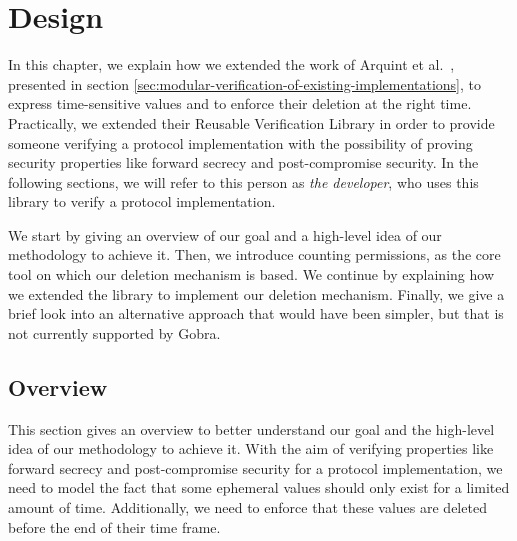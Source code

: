 
\chapter{Design}
\label{chap:design}

In this chapter, we explain how we extended the work of Arquint et al.\ \cite{}, presented in section \ref{sec:modular-verification-of-existing-implementations}, to express time-sensitive values and to enforce their deletion at the right time.
Practically, we extended their Reusable Verification Library in order to provide someone verifying a protocol implementation with the possibility of proving security properties like forward secrecy and post-compromise security.
In the following sections, we will refer to this person as \emph{the developer}, who uses this library to verify a protocol implementation.

We start by giving an overview of our goal and a high-level idea of our methodology to achieve it.
Then, we introduce counting permissions, as the core tool on which our deletion mechanism is based.
We continue by explaining how we extended the library to implement our deletion mechanism.
Finally, we give a brief look into an alternative approach that would have been simpler, but that is not currently supported by Gobra.

\section{Overview}
\label{sec:overview}

This section gives an overview to better understand our goal and the high-level idea of our methodology to achieve it.
With the aim of verifying properties like forward secrecy and post-compromise security for a protocol implementation, we need to model the fact that some ephemeral values should only exist for a limited amount of time.
Additionally, we need to enforce that these values are deleted before the end of their time frame.


